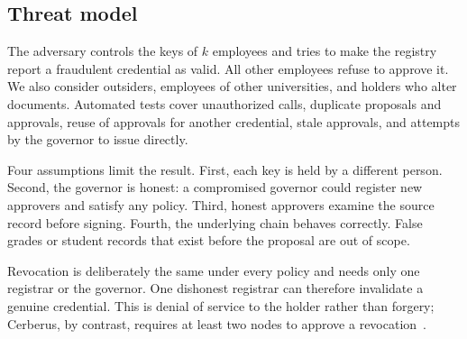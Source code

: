 \subsection{Threat model}\label{sec:threat}
The adversary controls the keys of $k$ employees and tries to make the registry report a fraudulent credential as valid. All other employees refuse to approve it. We also consider outsiders, employees of other universities, and holders who alter documents. Automated tests cover unauthorized calls, duplicate proposals and approvals, reuse of approvals for another credential, stale approvals, and attempts by the governor to issue directly.

Four assumptions limit the result. First, each key is held by a different person. Second, the governor is honest: a compromised governor could register new approvers and satisfy any policy. Third, honest approvers examine the source record before signing. Fourth, the underlying chain behaves correctly. False grades or student records that exist before the proposal are out of scope.

Revocation is deliberately the same under every policy and needs only one registrar or the governor. One dishonest registrar can therefore invalidate a genuine credential. This is denial of service to the holder rather than forgery; Cerberus, by contrast, requires at least two nodes to approve a revocation~\cite{tariq2023}.
